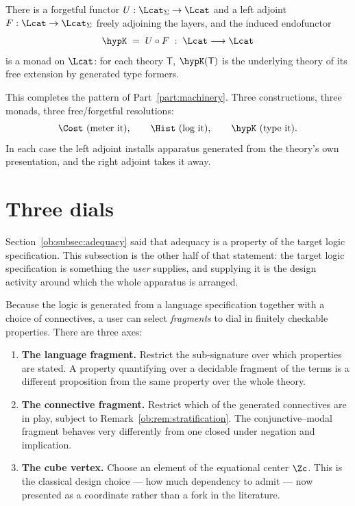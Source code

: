 \begin{proposition}
There is a forgetful functor $U : \Lcat_\Sigma \to \Lcat$ and a left adjoint
$F : \Lcat \to \Lcat_\Sigma$ freely adjoining the layers, and the induced endofunctor
\[
  \hypK \;=\; U \circ F \;:\; \Lcat \longrightarrow \Lcat
\]
is a monad on $\Lcat$: for each theory $\mathsf{T}$, $\hypK(\mathsf{T})$ is the underlying
theory of its free extension by generated type formers.
\end{proposition}

This completes the pattern of Part~\ref{part:machinery}. Three constructions, three monads, three
free/forgetful resolutions:
\[
  \Cost \ \text{(meter it)}, \qquad
  \Hist \ \text{(log it)}, \qquad
  \hypK  \ \text{(type it)} .
\]
In each case the left adjoint installs apparatus generated from the theory's own
presentation, and the right adjoint takes it away.

\section{Three dials}
\label{ob:subsec:dials}

Section~\ref{ob:subsec:adequacy} said that adequacy is a property of the target logic
specification. This subsection is the other half of that statement: the target logic
specification is something the \emph{user} supplies, and supplying it is the design
activity around which the whole apparatus is arranged.

Because the logic is generated from a language specification together with a choice of
connectives, a user can select \emph{fragments} to dial in finitely checkable properties.
There are three axes:

\begin{enumerate}[label=(\arabic*),leftmargin=2.5em]
  \item \textbf{The language fragment.} Restrict the sub-signature over which properties
    are stated. A property quantifying over a decidable fragment of the terms is a
    different proposition from the same property over the whole theory.
  \item \textbf{The connective fragment.} Restrict which of the generated connectives are
    in play, subject to Remark~\ref{ob:rem:stratification}. The conjunctive--modal fragment
    behaves very differently from one closed under negation and implication.
  \item \textbf{The cube vertex.} Choose an element of the equational center $\Zc$. This
    is the classical design choice --- how much dependency to admit --- now presented as a
    coordinate rather than a fork in the literature.
\end{enumerate}

